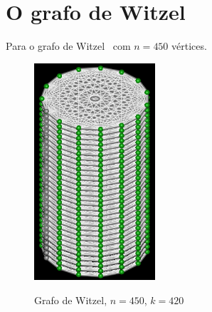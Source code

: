 \section{O grafo de Witzel}
Para o grafo de Witzel~\cite{cite:example-witzel} com $n=450$
vértices.

\begin{figure}[htb]
\centering
\includegraphics[width=0.4\textwidth]{img/witzel.png}
\label{fig:example-witzel}
\caption{Grafo de Witzel, $n=450$, $k=420$}
\end{figure}

